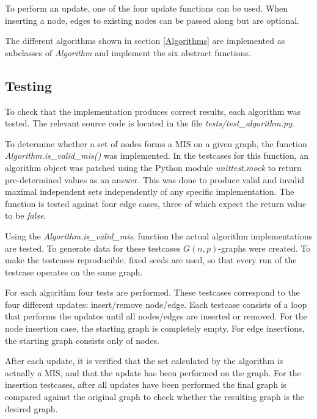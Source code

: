 \documentclass[letterpaper,11pt]{article}
\begin{document}
To perform an update, one of the four update functions can be used. When
inserting a node, edges to existing nodes can be passed along but are optional.

The different algorithms shown in section \ref{Algorithms} are implemented
as subclasses of \textit{Algorithm} and implement the six abstract functions.


\subsection{Testing}

To check that the implementation produces correct results, each algorithm was
tested. The relevant source code is located in the file
\textit{tests/test\_algorithm.py}.

To determine whether a set of nodes forms a MIS on a given graph, the function
\textit{Algorithm.is\_valid\_mis()} was implemented. In the testcases for this
function, an algorithm object was patched using the Python module
\textit{unittest.mock} to return pre-determined values as an answer. This was
done to produce valid and invalid maximal independent sets independently of any
specific implementation. The function is tested against four edge cases, three
of which expect the return value to be \textit{false}.

Using the \textit{Algorithm.is\_valid\_mis}, function the actual algorithm
implementations are tested.  To generate data for these testcases $G(n,
p)$-graphs were created. To make the testcases reproducible, fixed seeds are
used, so that every run of the testcase operates on the same graph.

For each algorithm four tests are performed.  These testcases correspond to the
four different updates: insert/remove node/edge.  Each testcase consists of a
loop that performs the updates until all nodes/edges are inserted or removed.
For the node insertion case, the starting graph is completely empty. For edge
insertions, the starting graph consists only of nodes.

After each update, it is verified that the set calculated by the algorithm is
actually a MIS, and that the update has been performed on the graph. For the
insertion testcases, after all updates have been performed the final graph is
compared against the original graph to check whether the resulting graph is the
desired graph.
\end{document}
